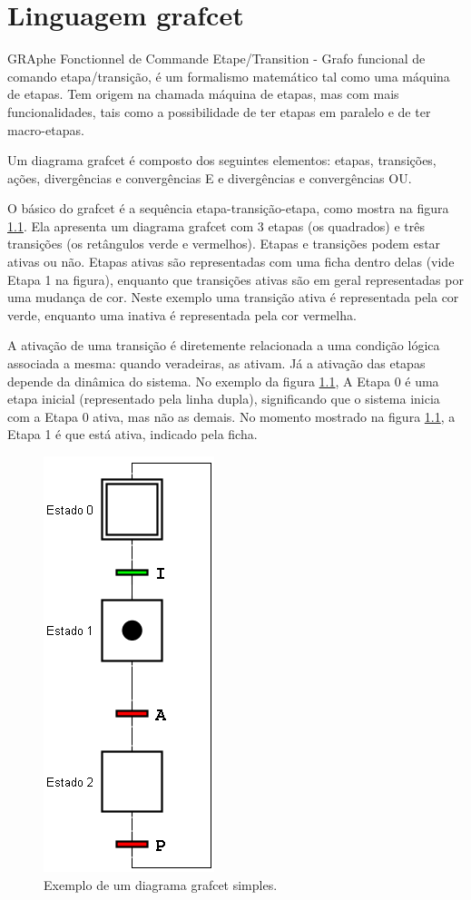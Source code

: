 \chapter{Linguagem grafcet}

GRAphe Fonctionnel de Commande Etape/Transition - Grafo funcional de comando etapa/transição, é um formalismo matemático tal como uma máquina de etapas. Tem origem na chamada máquina de etapas, mas com mais funcionalidades, tais como a possibilidade de ter etapas em paralelo e de ter macro-etapas.

Um diagrama grafcet é composto dos seguintes elementos: etapas, transições, ações, divergências e convergências E e divergências e convergências OU.

O básico do grafcet é a sequência etapa-transição-etapa, como mostra na figura \ref{fig:grafcetSimples}. Ela apresenta um diagrama grafcet com 3 etapas (os quadrados) e três transições (os retângulos verde e vermelhos). Etapas e transições podem estar ativas ou não. Etapas ativas são representadas com uma ficha dentro delas (vide Etapa 1 na figura), enquanto que transições ativas são em geral representadas por uma mudança de cor. Neste exemplo uma transição ativa é representada pela cor verde, enquanto uma inativa é representada pela cor vermelha.

A ativação de uma transição é diretemente relacionada a uma condição lógica associada a mesma: quando veradeiras, as ativam. Já a ativação das etapas depende da dinâmica do sistema. No exemplo da figura \ref{fig:grafcetSimples}, A Etapa 0 é uma etapa inicial (representado pela linha dupla), significando que o sistema inicia com a Etapa 0 ativa, mas não as demais. No momento mostrado na figura \ref{fig:grafcetSimples}, a Etapa 1 é que está ativa, indicado pela ficha.

\begin{figure}[hbt]
  \centering
  \includegraphics[scale=0.6]{figuras/grafcetSimples}
  \caption{Exemplo de um diagrama grafcet simples.}
  \label{fig:grafcetSimples}
\end{figure}

